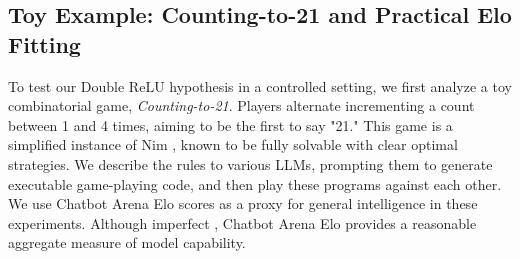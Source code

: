 \documentclass{article}
\begin{document}




\subsection{Toy Example: Counting-to-21 and Practical Elo Fitting}

To test our Double ReLU hypothesis in a controlled setting, we first analyze a toy combinatorial game, \emph{Counting-to-21}. Players alternate incrementing a count between 1 and 4 times, aiming to be the first to say "21." This game is a simplified instance of Nim \citep{bouton1901nim}, known to be fully solvable with clear optimal strategies. We describe the rules to various LLMs, prompting them to generate executable game-playing code, and then play these programs against each other. We use Chatbot Arena Elo scores as a proxy for general intelligence in these experiments.
Although imperfect \citep{singh2025leaderboardillusion}, Chatbot Arena Elo provides a reasonable aggregate measure of model capability.
\end{document}
